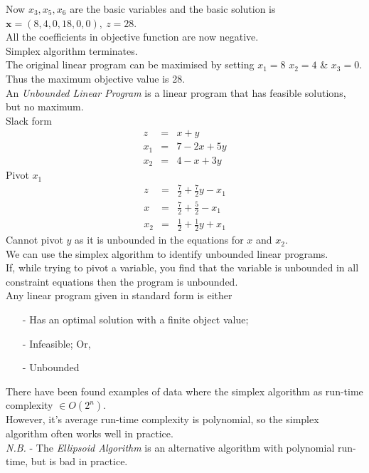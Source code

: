 \documentclass[11pt,a4paper]{article}
\begin{document}
Now $x_3, x_5, x_6$ are the basic variables and the basic solution is $\textbf{x}=(8,4,0,18,0,0),\ z=28$.\\
All the coefficients in objective function are now negative.\\
Simplex algorithm terminates.\\
The original linear program can be maximised by setting $x_1=8$ $x_2=4$ \& $x_3=0$.\\
Thus the maximum objective value is 28.\\

An \textit{Unbounded Linear Program} is a linear program that has feasible solutions, but no maximum.\\

\newpage
{}
Slack form
\[\begin{array}{rcl}
z&=&x+y\\
x_1&=&7-2x+5y\\
x_2&=&4-x+3y
\end{array}\]
Pivot $x_1$
\[\begin{array}{rcl}
z&=&\frac{7}{2}+\frac{7}{2}y-x_1\\
x&=&\frac{7}{2}+\frac{5}{2}-x_1\\
x_2&=&\frac{1}{2}+\frac{1}{2}y+x_1
\end{array}\]
Cannot pivot $y$ as it is unbounded in the equations for $x$ and $x_2$.\\

We can use the simplex algorithm to identify unbounded linear programs.\\
If, while trying to pivot a variable, you find that the variable is unbounded in all constraint equations then the program is unbounded.\\

Any linear program given in standard form is either
\begin{itemize}
	\item[-] Has an optimal solution with a finite object value;
	\item[-] Infeasible; Or,
	\item[-] Unbounded
\end{itemize}

There have been found examples of data where the simplex algorithm as run-time complexity $\in O(2^n)$.\\
However, it's average run-time complexity is polynomial, so the simplex algorithm often works well in practice.\\
\textit{N.B.} - The \textit{Ellipsoid Algorithm} is an alternative algorithm with polynomial run-time, but is bad in practice.
\end{document}
